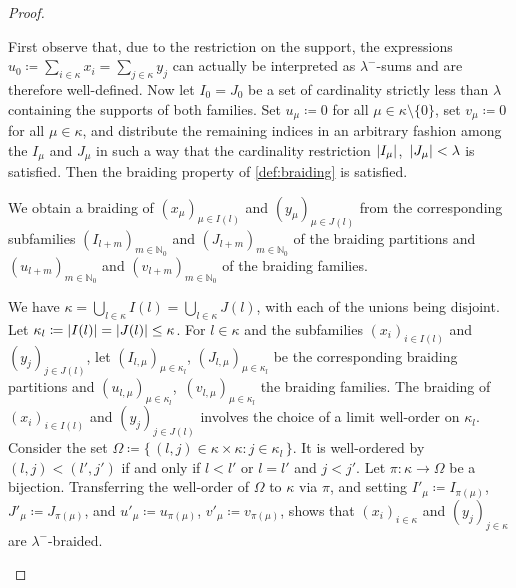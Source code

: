\documentclass[a4paper,11pt,oneside]{amsart}
\theoremstyle{remark}
\DeclarePairedDelimiter{\card}{\lvert}{\rvert}
\newcommand{\bN}{\mathbb N}
\begin{document}
\begin{proof}
  \begin{proofenumerate}
  \item[\ref{coll:trivial}]
  First observe that, due to the restriction on the support, the expressions $u_0\coloneqq \sum_{i \in \kappa} x_i=\sum_{j \in \kappa} y_j$ can actually be interpreted as $\lambda^-$-sums and are therefore well-defined.
  Now let $I_0=J_0$ be a set of cardinality strictly less than $\lambda$ containing the supports of both families.
  Set $u_\mu \coloneqq 0$ for all $\mu \in \kappa \setminus\{0\}$, set $v_\mu \coloneqq 0$ for all $\mu \in\kappa$, and distribute the remaining indices in an arbitrary fashion among the $I_\mu$ and $J_\mu$ in such a way that the cardinality restriction $\card{I_\mu}$,~$\card{J_\mu} < \lambda$ is satisfied.
  Then the braiding property of \cref{def:braiding} is satisfied.

  \item[\ref{coll:layers}]
    We obtain a braiding of $(x_{\mu})_{\mu \in I(l)}$ and $(y_{\mu})_{\mu \in J(l)}$ from the corresponding subfamilies $(I_{l+m})_{m \in \bN_0}$ and $(J_{l+m})_{m \in \bN_0}$ of the braiding partitions and $(u_{l+m})_{m \in \bN_0}$ and $(v_{l+m})_{m \in \bN_0}$ of the braiding families.

  \item[\ref{coll:layers-rev}]
    We have $\kappa = \bigcup_{l \in \kappa} I(l) = \bigcup_{l \in \kappa} J(l)$, with each of the unions being disjoint.
    Let $\kappa_l \coloneqq \card{I(l)} = \card{J(l)} \le \kappa$.
    For $l \in \kappa$ and the subfamilies $(x_i)_{i \in I(l)}$ and $(y_j)_{j \in J(l)}$, let $(I_{l,\mu})_{\mu \in \kappa_l}$, $(J_{l,\mu})_{\mu \in \kappa_l}$ be the corresponding braiding partitions and $(u_{l,\mu})_{\mu \in \kappa_l}$,~$(v_{l,\mu})_{\mu \in \kappa_l}$ the braiding families.
    The braiding of $(x_i)_{i \in I(l)}$ and $(y_j)_{j \in J(l)}$ involves the choice of a limit well-order on $\kappa_l$.
    Consider the set $\Omega \coloneqq \{\, (l,j) \in \kappa \times \kappa : j \in \kappa_l \,\}$.
    It is well-ordered by $(l,j) < (l',j')$ if and only if $l<l'$ or $l=l'$ and $j < j'$.
    Let $\pi \colon \kappa \to \Omega$ be a bijection.
    Transferring the  well-order of $\Omega$ to $\kappa$ via $\pi$, and setting $I'_\mu \coloneqq I_{\pi(\mu)}$, $J'_\mu \coloneqq J_{\pi(\mu)}$, and $u'_\mu \coloneqq u_{\pi(\mu)}$, $v'_\mu \coloneqq v_{\pi(\mu)}$, shows that $(x_i)_{i \in \kappa}$ and $(y_j)_{j \in \kappa}$ are $\lambda^-$-braided.
  

\end{proofenumerate}
\end{proof}
\end{document}
